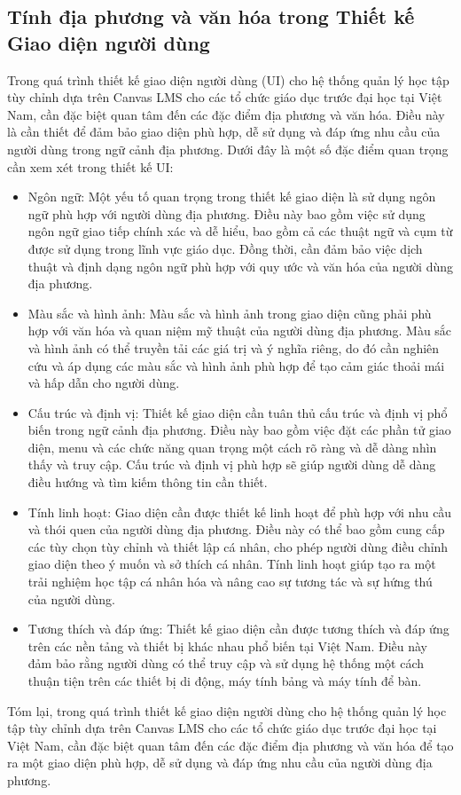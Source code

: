 \documentclass[../Thesis.tex]{subfiles}
\begin{document}
	\subsection{Tính địa phương và văn hóa trong Thiết kế Giao diện người dùng}
	Trong quá trình thiết kế giao diện người dùng (UI) cho hệ thống quản lý học tập tùy chỉnh dựa trên Canvas LMS cho các tổ chức giáo dục trước đại học tại Việt Nam, cần đặc biệt quan tâm đến các đặc điểm địa phương và văn hóa. Điều này là cần thiết để đảm bảo giao diện phù hợp, dễ sử dụng và đáp ứng nhu cầu của người dùng trong ngữ cảnh địa phương. Dưới đây là một số đặc điểm quan trọng cần xem xét trong thiết kế UI:

		\begin{itemize}
			\item Ngôn ngữ: Một yếu tố quan trọng trong thiết kế giao diện là sử dụng ngôn ngữ phù hợp với người dùng địa phương. Điều này bao gồm việc sử dụng ngôn ngữ giao tiếp chính xác và dễ hiểu, bao gồm cả các thuật ngữ và cụm từ được sử dụng trong lĩnh vực giáo dục. Đồng thời, cần đảm bảo việc dịch thuật và định dạng ngôn ngữ phù hợp với quy ước và văn hóa của người dùng địa phương.

			\item Màu sắc và hình ảnh: Màu sắc và hình ảnh trong giao diện cũng phải phù hợp với văn hóa và quan niệm mỹ thuật của người dùng địa phương. Màu sắc và hình ảnh có thể truyền tải các giá trị và ý nghĩa riêng, do đó cần nghiên cứu và áp dụng các màu sắc và hình ảnh phù hợp để tạo cảm giác thoải mái và hấp dẫn cho người dùng.

			\item Cấu trúc và định vị: Thiết kế giao diện cần tuân thủ cấu trúc và định vị phổ biến trong ngữ cảnh địa phương. Điều này bao gồm việc đặt các phần tử giao diện, menu và các chức năng quan trọng một cách rõ ràng và dễ dàng nhìn thấy và truy cập. Cấu trúc và định vị phù hợp sẽ giúp người dùng dễ dàng điều hướng và tìm kiếm thông tin cần thiết.

			\item Tính linh hoạt: Giao diện cần được thiết kế linh hoạt để phù hợp với nhu cầu và thói quen của người dùng địa phương. Điều này có thể bao gồm cung cấp các tùy chọn tùy chỉnh và thiết lập cá nhân, cho phép người dùng điều chỉnh giao diện theo ý muốn và sở thích cá nhân. Tính linh hoạt giúp tạo ra một trải nghiệm học tập cá nhân hóa và nâng cao sự tương tác và sự hứng thú của người dùng.

			\item Tương thích và đáp ứng: Thiết kế giao diện cần được tương thích và đáp ứng trên các nền tảng và thiết bị khác nhau phổ biến tại Việt Nam. Điều này đảm bảo rằng người dùng có thể truy cập và sử dụng hệ thống một cách thuận tiện trên các thiết bị di động, máy tính bảng và máy tính để bàn.
		\end{itemize}
		Tóm lại, trong quá trình thiết kế giao diện người dùng cho hệ thống quản lý học tập tùy chỉnh dựa trên Canvas LMS cho các tổ chức giáo dục trước đại học tại Việt Nam, cần đặc biệt quan tâm đến các đặc điểm địa phương và văn hóa để tạo ra một giao diện phù hợp, dễ sử dụng và đáp ứng nhu cầu của người dùng địa phương.
\end{document}
